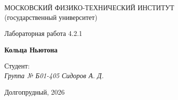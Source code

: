 \thispagestyle{empty}

\begin{center}
    МОСКОВСКИЙ ФИЗИКО-ТЕХНИЧЕСКИЙ ИНСТИТУТ \\
    (государственный университет)
\end{center}

\vfill

\begin{center}
    Лабораторная работа 4.2.1 \\ 
    \vspace{20pt}
    
    \textbf{Кольца Ньютона}
\end{center}  

\vfill

    \noindent Студент: \\
    \textit{Группа № Б01-405 \hfill Сидоров А. Д.}

\vfill

\begin{center}
    Долгопрудный, 2026
\end{center}

